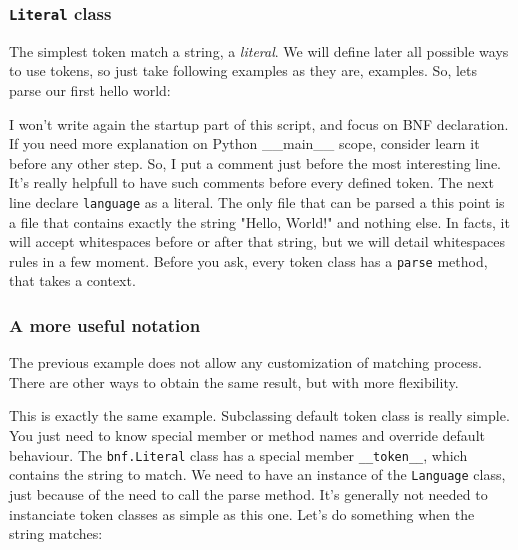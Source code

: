 \documentclass[a4paper]{article}
\newcommand{\insertpython}[1]{%
{\ttfamily}%
}
\begin{document}
            \subsubsection{\texttt{Literal} class}
                The simplest token match a string, a \textit{literal}. We
                will define later all possible ways to use tokens, so just take
                following examples as they are, examples.
                So, lets parse our first hello world:
                \insertpython{listings/bnf/ex01.py}

                I won't write again the startup part of this script, and focus on BNF
                declaration. If you need more explanation on Python \_\_main\_\_ scope,
                consider learn it before any other step. So, I put a comment
                just before the most interesting line. It's really helpfull to have
                such comments before every defined token. The next line declare
                \texttt{language} as a literal. The only file that can be parsed a this point
                is a file that contains exactly the string "Hello, World!" and nothing else.
                In facts, it will accept whitespaces before or after that string, but we will
                detail whitespaces rules in a few moment.
                Before you ask, every token class has a \texttt{parse} method, that takes
                a context.

            \subsubsection{A more useful notation}
                The previous example does not allow any customization of matching process.
                There are other ways to obtain the same result, but with more flexibility.
                \insertpython{listings/bnf/ex02.py}

                This is exactly the same example. Subclassing default token class is really
                simple. You just need to know special member or method names and override
                default behaviour. The \texttt{bnf.Literal} class has a special member
                \texttt{\_\_token\_\_}, which contains the string to match.
                We need to have an instance of the \texttt{Language} class, just because
                of the need to call the parse method. It's generally not needed to instanciate
                token classes as simple as this one.
                Let's do something when the string matches:
                \insertpython{listings/bnf/ex03.py}
\end{document}
